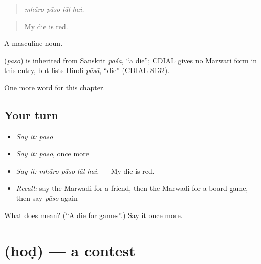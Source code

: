 \begin{quote}
   
\end{quote}

\begin{quote}
\emph{mhāro pāso lāl hai.}
\end{quote}

\begin{quote}
My die is red.
\end{quote}

A masculine noun.

\begin{cousinweb}
\textbf{} (\emph{pāso}) is inherited from Sanskrit \emph{pāśa}, \textquotedblleft{}a die\textquotedblright{}; CDIAL gives no Marwari form in this entry, but lists Hindi \emph{pāsā}, \textquotedblleft{}die\textquotedblright{} (CDIAL 8132).
\end{cousinweb}

\begin{grammarlens}[title={What you've built}]
One more word for this chapter.
\end{grammarlens}

\subsection*{Your turn}
\begin{itemize}
\raggedright
  \item \emph{Say it:} \emph{pāso}
  \item \emph{Say it:} \emph{pāso}, once more
  \item \emph{Say it:} \emph{mhāro pāso lāl hai.} — My die is red.
  \item \emph{Recall:} say the Marwadi for a friend, then the Marwadi for a board game, then say \emph{pāso} again
\end{itemize}

\begin{tcolorbox}[breakable,colback=teal!4,colframe=teal!35!black,title={Before you move on}]
What does  mean? (\textquotedblleft{}A die for games\textquotedblright{}.) Say it once more.
\end{tcolorbox}
\section[\texorpdfstring{\mw{होड} (hoḍ)}{होड (hoḍ)}]{ (hoḍ) — a contest}

\label{lesson:MW-C279-hod}



